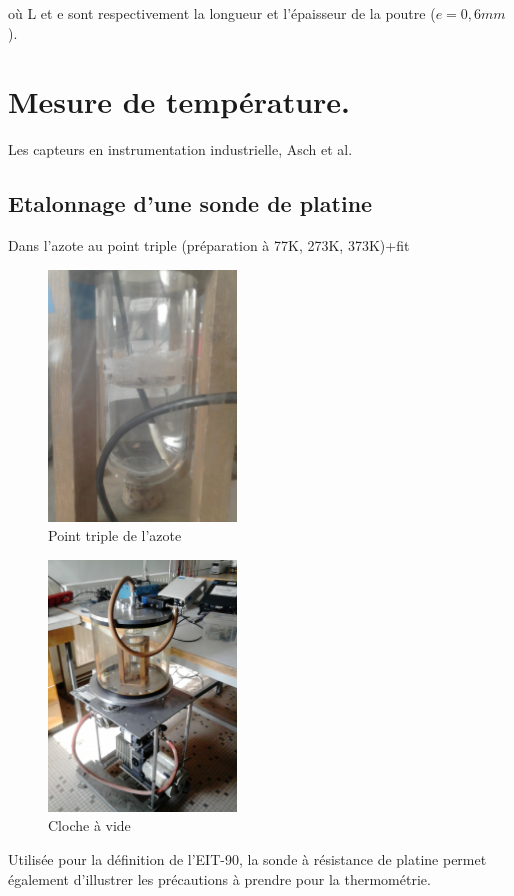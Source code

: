 \documentclass{article}%
\begin{document}
où L et e sont respectivement la longueur et l'épaisseur de la poutre ($e = 0,6 mm$).

\section{Mesure de température.}
Les capteurs en instrumentation industrielle, Asch et al.
\subsection{Etalonnage d'une sonde de platine}
Dans l'azote au point triple
(préparation à 77K, 273K, 373K)+fit

\begin{figure}
	\centerline{\includegraphics[width=5cm]{images-exp/pt_triple2.jpg}}
	\caption{Point triple de l'azote}
\end{figure}
\begin{figure}
	\centerline{\includegraphics[width=5cm]{images-exp/cloche_vide.jpg}}
	\caption{Cloche à vide}
\end{figure}

Utilisée pour la définition de l'EIT-90, la sonde à résistance de platine permet également d'illustrer les précautions à prendre pour la thermométrie.
\end{document}
